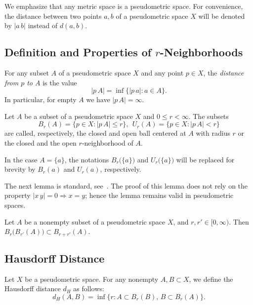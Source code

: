 \documentclass{svproc}
\begin{document}
We emphasize that any metric space is a pseudometric space. For convenience, the distance between two points $a, b$ of a pseudometric space $X$ will be denoted by $|a\, b|$ instead of $d(a, b)$.


\subsection{Definition and Properties of $r$-Neighborhoods}\label{sec:Neighborhoods}

\begin{definition}\label{dfn:one}
For any subset $A$ of a pseudometric space $X$ and any point $p\in X$, the \textit{distance from $p$ to $A$} is the value
$$
|p\, A|=\inf\bigl\{|p\, a|\colon a\in A\bigr\}.
$$
In particular, for empty $A$ we have $|p\, A|=\infty$.
\end{definition}

\begin{definition}\label{dfn:balls}
Let $A$ be a subset of a pseudometric space $X$ and $0\le r<\infty$. The subsets
$$
B_r(A)=\{p\in X\colon |p\, A|\le r\},\ \ U_r(A)=\{p\in X\colon |p\, A|<r\}
$$
are called, respectively, the closed and open ball centered at $A$ with radius $r$ or the closed and the open $r$-neighborhood of $A$.
\end{definition}

In the case $A = \{a\}$, the notations $B_r\bigl(\{a\}\bigr)$ and $U_r\bigl(\{a\}\bigr)$ will be replaced for brevity by $B_r(a)$ and $U_r(a)$, respectively. 

The next lemma is standard, see~\cite[p.~22]{TuzLections}. The proof of this lemma does not rely on the property $|x\, y|=0 \Rightarrow x=y$; hence the lemma remains valid in pseudometric spaces.

\begin{lemma}\label{sum_0}
Let $A$ be a nonempty subset of a pseudometric space $X$, and $r, r' \in [0, \infty)$. Then $B_r\bigl(B_{r'}(A)\bigr)\subset B_{r+r'}(A)$.
\end{lemma}


\subsection{Hausdorff Distance}\label{sec:Haus}

\begin{definition}\label{distance_H}
Let $X$ be a pseudometric space. For any nonempty $A, B\subset X$, we define the Hausdorff distance $d_H$ as follows:
$$
d_H(A, B) = \inf\bigl\{r:A\subset B_r(B),\,B\subset B_r(A)\bigr\}.
$$
\end{definition}
\end{document}
